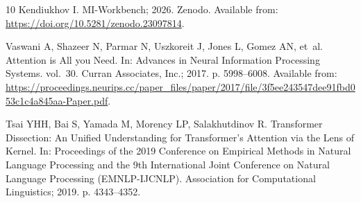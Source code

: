 \documentclass[10pt,letterpaper]{article}
\begin{document}
\begin{thebibliography}{10}
Kendiukhov I. {MI-Workbench}; 2026.
\newblock Zenodo.
\newblock Available from: \url{https://doi.org/10.5281/zenodo.23097814}.

Vaswani A, Shazeer N, Parmar N, Uszkoreit J, Jones L, Gomez AN, et~al.
\newblock Attention is All you Need.
\newblock In: Advances in Neural Information Processing Systems. vol.~30.
  Curran Associates, Inc.; 2017. p. 5998--6008.
\newblock Available from:
  \url{https://proceedings.neurips.cc/paper_files/paper/2017/file/3f5ee243547dee91fbd053c1c4a845aa-Paper.pdf}.

Tsai YHH, Bai S, Yamada M, Morency LP, Salakhutdinov R.
\newblock Transformer Dissection: An Unified Understanding for Transformer's
  Attention via the Lens of Kernel.
\newblock In: Proceedings of the 2019 Conference on Empirical Methods in
  Natural Language Processing and the 9th International Joint Conference on
  Natural Language Processing (EMNLP-IJCNLP). Association for Computational
  Linguistics; 2019. p. 4343--4352.

\end{thebibliography}
\end{document}
